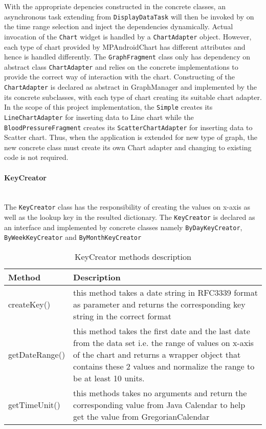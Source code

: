 With the appropriate depencies constructed in the concrete classes, an asynchronous task extending from
\texttt{DisplayDataTask} will then be invoked by on the time range selection and inject the dependencies dynamically.
Actual invocation of the \texttt{Chart} widget is handled by a \texttt{ChartAdapter} object. However, each type of
chart provided by MPAndroidChart has different attributes and hence is handled differently. The \texttt{GraphFragment}
class only has dependency on abstract class \texttt{ChartAdapter} and relies on the concrete implementations to provide
the correct way of interaction with the chart. Constructing of the \texttt{ChartAdapter} is declared as abstract in
GraphManager and implemented by the its concrete subclasses, with each type of chart creating its suitable chart
adapter. In the scope of this project implementation, the \texttt{Simple} creates its \texttt{LineChartAdapter} for
inserting data to Line chart while the \texttt{BloodPressureFragment} creates its \texttt{ScatterChartAdapter} for
inserting data to Scatter chart. Thus, when the application is extended for new type of graph, the new concrete class
must create its own Chart adapter and changing to existing code is not required.

\paragraph{KeyCreator}\mbox{} \\
The \texttt{KeyCreator} class has the responsibility of creating the values on x-axis as well as the lookup key in the
resulted dictionary. The \texttt{KeyCreator} is declared as an interface and implemented by concrete classes namely
\texttt{ByDayKeyCreator}, \texttt{ByWeekKeyCreator} and \texttt{ByMonthKeyCreator}

\begin{table}
\begin{center}
    \begin{tabularx}{\textwidth}{| l | X |}
        \hline Method & Description \\
        \hline createKey() & 
            this method takes a date string in RFC3339 format as parameter and returns the corresponding key string in
            the correct format \\
        \hline getDateRange() &
            this method takes the first date and the last date from the data set i.e. the range of values on x-axis of
            the chart and returns a wrapper object that contains these 2 values and normalize the range to be at least
            10 units. \\
        \hline getTimeUnit() &
            this methods takes no arguments and return the corresponding value from Java Calendar to help get the value
            from GregorianCalendar \\
        \hline
    \end{tabularx}
\end{center}
    \caption{KeyCreator methods description}
\end{table}

